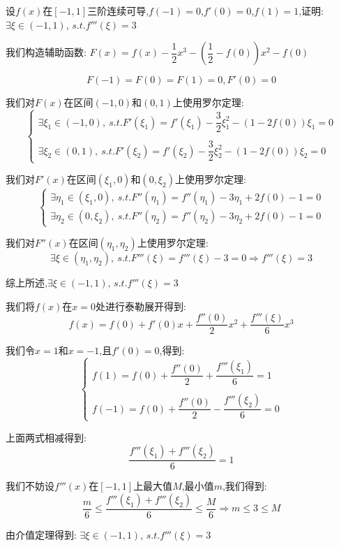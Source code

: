 
\begin{proposition}[$\spadesuit\spadesuit$]
	设$f(x)$在$[-1,1]$三阶连续可导,$f(-1)=0$,$f'(0)=0$,$f(1)=1$,证明: $\exists \xi\in(-1,1)$, $s.t. f'''(\xi)=3$
\end{proposition}
\begin{solution}

	我们构造辅助函数:  $F(x)=f(x)-\dfrac{1}{2}x^3-\left( \dfrac{1}{2}-f(0)\right) x^2-f(0)$

	$$F(-1)=F(0)=F(1)=0,F'(0)=0$$

	我们对$F(x)$在区间$(-1,0)$和$(0,1)$上使用罗尔定理:
	$$\left\lbrace
		\begin{array}{l}
			\exists \xi_{1}\in(-1,0),\ s.t. F'(\xi_{1})=f'(\xi_{1})-\dfrac{3}{2}\xi_{1}^2-\left( 1-2f(0)\right)\xi_{1}=0 \\
			\\
			\exists \xi_{2}\in(0,1),\ s.t. F'(\xi_{2})=f'(\xi_{2})-\dfrac{3}{2}\xi_{2}^2-\left( 1-2f(0)\right)\xi_{2}=0
		\end{array}
		\right. $$

	我们对$F'(x)$在区间$(\xi_{1},0)$和$(0,\xi_{2})$上使用罗尔定理:
	$$\left\lbrace
		\begin{array}{l}
			\exists \eta_{1}\in(\xi_{1},0),\ s.t. F''(\eta_{1})=f''(\eta_{1})-3\eta_{1}+2f(0)-1=0 \\
			\exists \eta_{2}\in(0,\xi_{2}),\ s.t. F''(\eta_{2})=f''(\eta_{2})-3\eta_{2}+2f(0)-1=0
		\end{array}
		\right. $$

	我们对$F''(x)$在区间$(\eta_{1},\eta_{2})$上使用罗尔定理:
	$$\exists \xi\in(\eta_{1},\eta_{2}),\ s.t. F'''(\xi)=f'''(\xi)-3=0\Rightarrow f'''(\xi)=3$$

	综上所述,$\exists \xi\in(-1,1)$, $s.t. f'''(\xi)=3$
\end{solution}
\begin{anymark}[注: 泰勒展开]
	我们将$f(x)$在$x=0$处进行泰勒展开得到:
	$$f(x)=f(0)+f'(0)x+\dfrac{f''(0)}{2}x^2+\dfrac{f'''(\xi)}{6}x^3$$

	我们令$x=1$和$x=-1$,且$f'(0)=0$,得到:
	$$\left\lbrace
		\begin{array}{l}
			f(1)=f(0)+\dfrac{f''(0)}{2}+\dfrac{f'''(\xi_{1})}{6}=1 \\
			\\
			f(-1)=f(0)+\dfrac{f''(0)}{2}-\dfrac{f'''(\xi_{2})}{6}=0
		\end{array}
		\right. $$

	上面两式相减得到:
	$$\dfrac{f'''(\xi_{1})+f'''(\xi_{2})}{6}=1$$

	我们不妨设$f'''(x)$在$[-1,1]$上最大值$M$,最小值$m$,我们得到:
	$$\dfrac{m}{6}\leq\dfrac{f'''(\xi_{1})+f'''(\xi_{2})}{6}\leq \dfrac{M}{6}\Rightarrow m\leq 3\leq M$$

	由介值定理得到: $\exists \xi\in(-1,1)$, $s.t. f'''(\xi)=3$
\end{anymark}

